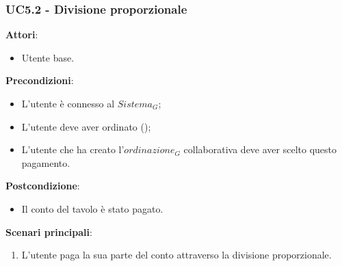 \subsubsection{UC5.2 - Divisione proporzionale}\label{usecase:5.2}
\textbf{Attori}:
\begin{itemize}
    \item Utente base.
\end{itemize}
\textbf{Precondizioni}:
\begin{itemize}
    \item L'utente è connesso al $\textit{Sistema}_G$;
    \item L'utente deve aver ordinato ();
    \item L'utente che ha creato l'$\textit{ordinazione}_G$ collaborativa deve aver scelto questo pagamento.
\end{itemize}
\textbf{Postcondizione}:
\begin{itemize}
    \item Il conto del tavolo è stato pagato.
\end{itemize}
\textbf{Scenari principali}:
\begin{enumerate}
    \item L'utente paga la sua parte del conto attraverso la divisione proporzionale.
\end{enumerate}